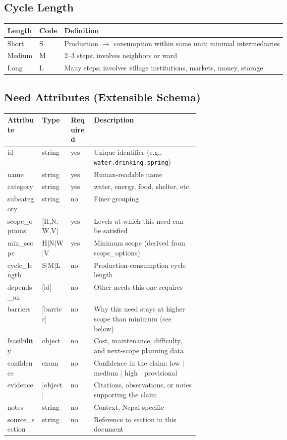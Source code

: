 \documentclass[11pt,a4paper]{article}
\begin{document}
\subsection{Cycle Length}

\begin{tabular}{lll}
\hline
\textbf{Length} & \textbf{Code} & \textbf{Definition} \\
\hline
Short & S & Production $\rightarrow$ consumption within same unit; minimal intermediaries \\
Medium & M & 2--3 steps; involves neighbors or ward \\
Long & L & Many steps; involves village institutions, markets, money, storage \\
\hline
\end{tabular}

\subsection{Need Attributes (Extensible Schema)}

\begin{tabularx}{\linewidth}{>{\raggedright\arraybackslash}p{0.18\linewidth} >{\raggedright\arraybackslash}p{0.15\linewidth} >{\raggedright\arraybackslash}p{0.12\linewidth} >{\raggedright\arraybackslash}X}
\hline
\textbf{Attribute} & \textbf{Type} & \textbf{Required} & \textbf{Description} \\
\hline
id & string & yes & Unique identifier (e.g., \texttt{water.drinking.spring}) \\
name & string & yes & Human-readable name \\
category & string & yes & water, energy, food, shelter, etc. \\
subcategory & string & no & Finer grouping \\
scope\_options & {[}H,N,W,V{]} & yes & Levels at which this need can be satisfied \\
min\_scope & H$|$N$|$W$|$V & yes & Minimum scope (derived from scope\_options) \\
cycle\_length & S$|$M$|$L & no & Production-consumption cycle length \\
depends\_on & {[}id{]} & no & Other needs this one requires \\
barriers & {[}barrier{]} & no & Why this need stays at higher scope than minimum (see below) \\
feasibility & object & no & Cost, maintenance, difficulty, and next-scope planning data \\
confidence & enum & no & Confidence in the claim: low $|$ medium $|$ high $|$ provisional \\
evidence & {[}object{]} & no & Citations, observations, or notes supporting the claim \\
notes & string & no & Context, Nepal-specific \\
source\_section & string & no & Reference to section in this document \\
\hline
\end{tabularx}
\end{document}
